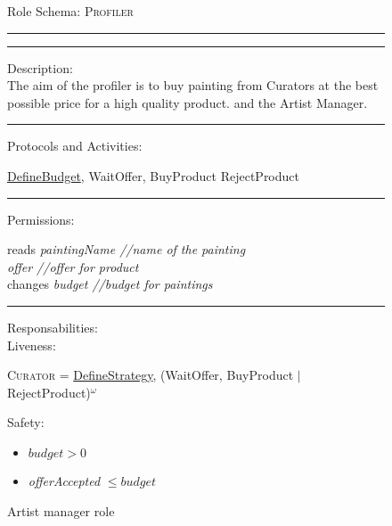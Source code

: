 \documentclass[a4paper,11pt]{report}
\begin{document}
  \begin{figure}[ht!]
    \begin{mdframed}
      Role Schema: \textsc{Profiler} \\ \hrule \vspace{2pt} \hrule \vspace{10pt}
      Description:\\
      The aim of the profiler is to buy painting from Curators at the best possible
      price for a high quality product.
      and the Artist Manager.
      \\ \hrule \vspace{10pt}
      Protocols and Activities:
      \vspace{-10pt}
      \begin{flushleft}
       \underline{DefineBudget}, WaitOffer, BuyProduct
       RejectProduct
      \end{flushleft}
      \hrule \vspace{10pt}
      Permissions:\\
      \vspace{-10pt}
      \begin{center}
       reads \textit{paintingName //name of the painting}\\
	    \textit{offer //offer for product}\\
      changes \textit{budget //budget for paintings}
      \end{center}
      \hrule \vspace{10pt}
      Responsabilities:\\
      Liveness:
      \vspace{-10pt}
      \begin{flushleft}
      \small\textsc{Curator} = \underline{DefineStrategy}, (WaitOffer, BuyProduct $\mid$
      RejectProduct)$^\omega$
      \end{flushleft}
      Safety:
      \vspace{-10pt}
      \begin{itemize}
      \item $budget > 0$
       \item \textit{offerAccepted} $\leq budget$
      \end{itemize}
    \end{mdframed}
  \caption{Artist manager role}
  \label{figure:role_profiler}
  \end{figure}
  
\end{document}
